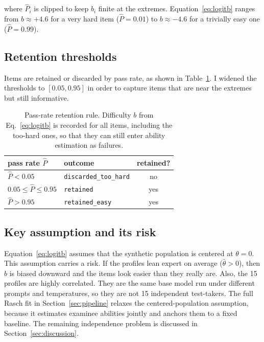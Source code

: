 where $\hat{P}_i$ is clipped to keep $\hat{b}_i$ finite at the extremes.
Equation~\eqref{eq:logitb} ranges from $b \approx +4.6$ for a very hard
item ($\hat{P}=0.01$) to $b \approx -4.6$ for a trivially easy one
($\hat{P}=0.99$).

\subsection{Retention thresholds}
Items are retained or discarded by pass rate, as shown in
Table~\ref{tab:retention}. I widened the thresholds to $[0.05, 0.95]$ in
order to capture items that are near the extremes but still informative.

\begin{table}[htbp]
\centering
\small
\begin{tabular}{@{}llc@{}}
\toprule
pass rate $\hat{P}$ & outcome & retained? \\
\midrule
$\hat{P} < 0.05$        & \texttt{discarded\_too\_hard} & no \\
$0.05 \le \hat{P} \le 0.95$ & \texttt{retained}        & yes \\
$\hat{P} > 0.95$        & \texttt{retained\_easy}       & yes \\
\bottomrule
\end{tabular}
\caption{Pass-rate retention rule. Difficulty $b$ from
Eq.~\eqref{eq:logitb} is recorded for all items, including the
too-hard ones, so that they can still enter ability estimation as
failures.}
\label{tab:retention}
\end{table}

\subsection{Key assumption and its risk}
Equation~\eqref{eq:logitb} assumes that the synthetic population is
centered at $\theta = 0$. This assumption carries a risk. If the profiles
lean expert on average ($\bar{\theta} > 0$), then $b$ is biased downward
and the items look easier than they really are. Also, the 15 profiles are
highly correlated. They are the same base model run under different
prompts and temperatures, so they are not 15 independent test-takers. The
full Rasch fit in Section~\ref{sec:pipeline} relaxes the
centered-population assumption, because it estimates examinee abilities
jointly and anchors them to a fixed baseline. The remaining independence
problem is discussed in Section~\ref{sec:discussion}.
